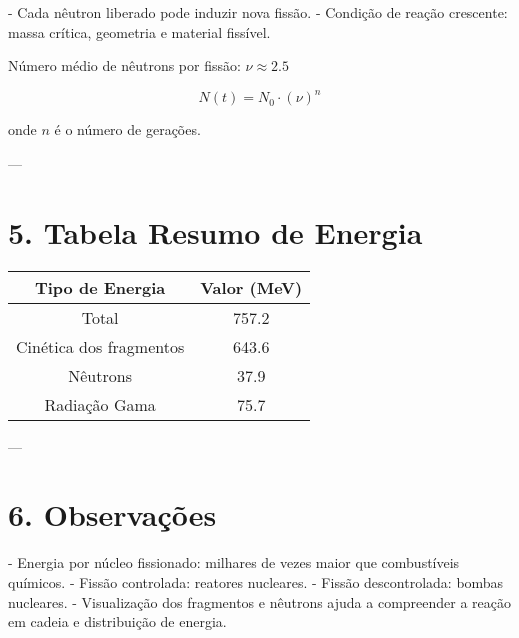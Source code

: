 \documentclass[12pt,a4paper]{article}
\begin{document}
- Cada nêutron liberado pode induzir nova fissão.  
- Condição de reação crescente: massa crítica, geometria e material fissível.

Número médio de nêutrons por fissão: \(\nu \approx 2.5\)

\[
N(t) = N_0 \cdot (\nu)^n
\]

onde \(n\) é o número de gerações.

\begin{center}
\end{center}

---

\section*{5. Tabela Resumo de Energia}

\begin{center}
\begin{tabular}{|c|c|}
\hline
Tipo de Energia & Valor (MeV) \\
\hline
Total & 757.2 \\
Cinética dos fragmentos & 643.6 \\
Nêutrons & 37.9 \\
Radiação Gama & 75.7 \\
\hline
\end{tabular}
\end{center}

---

\section*{6. Observações}

- Energia por núcleo fissionado: milhares de vezes maior que combustíveis químicos.  
- Fissão controlada: reatores nucleares.  
- Fissão descontrolada: bombas nucleares.  
- Visualização dos fragmentos e nêutrons ajuda a compreender a reação em cadeia e distribuição de energia.
\end{document}
